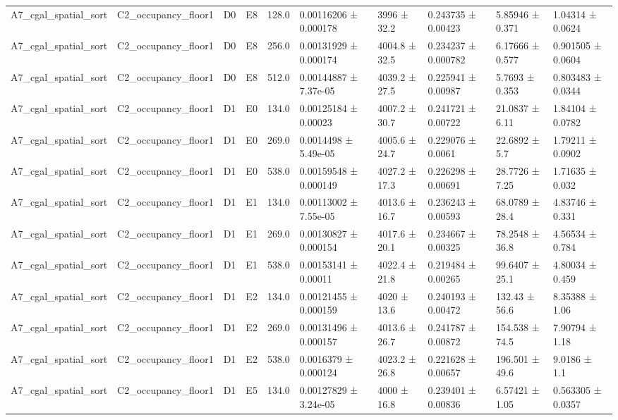 \begin{table}
\begin{tabular}{llllllllll}
A7\_cgal\_spatial\_sort & C2\_occupancy\_floor1 & D0 & E8 & 128.0 & 0.00116206 ± 0.000178 & 3996 ± 32.2 & 0.243735 ± 0.00423 & 5.85946 ± 0.371 & 1.04314 ± 0.0624 \\
A7\_cgal\_spatial\_sort & C2\_occupancy\_floor1 & D0 & E8 & 256.0 & 0.00131929 ± 0.000174 & 4004.8 ± 32.5 & 0.234237 ± 0.000782 & 6.17666 ± 0.577 & 0.901505 ± 0.0604 \\
A7\_cgal\_spatial\_sort & C2\_occupancy\_floor1 & D0 & E8 & 512.0 & 0.00144887 ± 7.37e-05 & 4039.2 ± 27.5 & 0.225941 ± 0.00987 & 5.7693 ± 0.353 & 0.803483 ± 0.0344 \\
A7\_cgal\_spatial\_sort & C2\_occupancy\_floor1 & D1 & E0 & 134.0 & 0.00125184 ± 0.00023 & 4007.2 ± 30.7 & 0.241721 ± 0.00722 & 21.0837 ± 6.11 & 1.84104 ± 0.0782 \\
A7\_cgal\_spatial\_sort & C2\_occupancy\_floor1 & D1 & E0 & 269.0 & 0.0014498 ± 5.49e-05 & 4005.6 ± 24.7 & 0.229076 ± 0.0061 & 22.6892 ± 5.7 & 1.79211 ± 0.0902 \\
A7\_cgal\_spatial\_sort & C2\_occupancy\_floor1 & D1 & E0 & 538.0 & 0.00159548 ± 0.000149 & 4027.2 ± 17.3 & 0.226298 ± 0.00691 & 28.7726 ± 7.25 & 1.71635 ± 0.032 \\
A7\_cgal\_spatial\_sort & C2\_occupancy\_floor1 & D1 & E1 & 134.0 & 0.00113002 ± 7.55e-05 & 4013.6 ± 16.7 & 0.236243 ± 0.00593 & 68.0789 ± 28.4 & 4.83746 ± 0.331 \\
A7\_cgal\_spatial\_sort & C2\_occupancy\_floor1 & D1 & E1 & 269.0 & 0.00130827 ± 0.000154 & 4017.6 ± 20.1 & 0.234667 ± 0.00325 & 78.2548 ± 36.8 & 4.56534 ± 0.784 \\
A7\_cgal\_spatial\_sort & C2\_occupancy\_floor1 & D1 & E1 & 538.0 & 0.00153141 ± 0.00011 & 4022.4 ± 21.8 & 0.219484 ± 0.00265 & 99.6407 ± 25.1 & 4.80034 ± 0.459 \\
A7\_cgal\_spatial\_sort & C2\_occupancy\_floor1 & D1 & E2 & 134.0 & 0.00121455 ± 0.000159 & 4020 ± 13.6 & 0.240193 ± 0.00472 & 132.43 ± 56.6 & 8.35388 ± 1.06 \\
A7\_cgal\_spatial\_sort & C2\_occupancy\_floor1 & D1 & E2 & 269.0 & 0.00131496 ± 0.000157 & 4013.6 ± 26.7 & 0.241787 ± 0.00872 & 154.538 ± 74.5 & 7.90794 ± 1.18 \\
A7\_cgal\_spatial\_sort & C2\_occupancy\_floor1 & D1 & E2 & 538.0 & 0.0016379 ± 0.000124 & 4023.2 ± 26.8 & 0.221628 ± 0.00657 & 196.501 ± 49.6 & 9.0186 ± 1.1 \\
A7\_cgal\_spatial\_sort & C2\_occupancy\_floor1 & D1 & E5 & 134.0 & 0.00127829 ± 3.24e-05 & 4000 ± 16.8 & 0.239401 ± 0.00836 & 6.57421 ± 1.05 & 0.563305 ± 0.0357 \\

\end{tabular}
\end{table}
